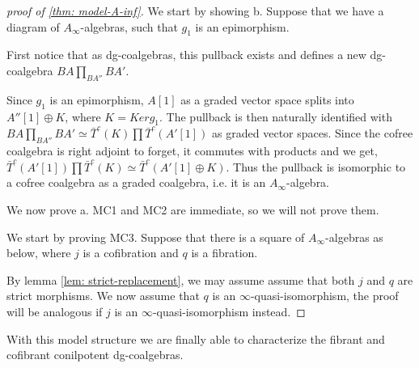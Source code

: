 \documentclass[../thesis.tex]{subfiles}
\begin{document}
        \begin{proof}[proof of \ref{thm: model-A-inf}]
            We start by showing b. Suppose that we have a diagram of $A_\infty$-algebras, such that $g_1$ is an epimorphism.
            \begin{center}
            \end{center}
            First notice that as dg-coalgebras, this pullback exists and defines a new dg-coalgebra $BA \prod_{BA''}BA'$.

            Since $g_1$ is an epimorphism, $A[1]$ as a graded vector space splits into $A''[1] \oplus K$, where $K = Kerg_1$. The pullback is then naturally identified with $BA \prod_{BA''}BA' \simeq \bar{T}^c(K)\prod \bar{T}^c(A'[1])$ as graded vector spaces. Since the cofree coalgebra is right adjoint to forget, it commutes with products and we get, $\bar{T}^c(A'[1])\prod \bar{T}^c(K) \simeq \bar{T}^c(A'[1]\oplus K)$. Thus the pullback is isomorphic to a cofree coalgebra as a graded coalgebra, i.e. it is an $A_\infty$-algebra.

            We now prove a. MC1 and MC2 are immediate, so we will not prove them.

            We start by proving MC3. Suppose that there is a square of $A_\infty$-algebras as below, where $j$ is a cofibration and $q$ is a fibration.
            \begin{center}
            \end{center}

            By lemma \ref{lem: strict-replacement}, we may assume assume that both $j$ and $q$ are strict morphisms. We now assume that $q$ is an $\infty$-quasi-isomorphism, the proof will be analogous if $j$ is an $\infty$-quasi-isomorphism instead.

            
        \end{proof}

        With this model structure we are finally able to characterize the fibrant and cofibrant conilpotent dg-coalgebras.
\end{document}
